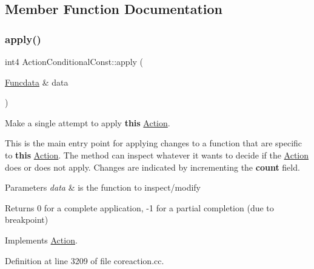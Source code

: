 \subsection{Member Function Documentation}
\mbox{\label{class_action_conditional_const_a36547a8bf4913bf94efa661b7f39e461}} 
\subsubsection{\texorpdfstring{apply()}{apply()}}
{\footnotesize\ttfamily int4 Action\+Conditional\+Const\+::apply (\begin{DoxyParamCaption}\item[{\mbox{\hyperlink{class_funcdata}{Funcdata}} \&}]{data }\end{DoxyParamCaption})\hspace{0.3cm}{\ttfamily [virtual]}}



Make a single attempt to apply {\bfseries{this}} \mbox{\hyperlink{class_action}{Action}}. 

This is the main entry point for applying changes to a function that are specific to {\bfseries{this}} \mbox{\hyperlink{class_action}{Action}}. The method can inspect whatever it wants to decide if the \mbox{\hyperlink{class_action}{Action}} does or does not apply. Changes are indicated by incrementing the {\bfseries{count}} field. 
\begin{DoxyParams}{Parameters}
{\em data} & is the function to inspect/modify \\
\hline
\end{DoxyParams}
\begin{DoxyReturn}{Returns}
0 for a complete application, -\/1 for a partial completion (due to breakpoint) 
\end{DoxyReturn}


Implements \mbox{\hyperlink{class_action_aac1c3999d6c685b15f5d9765a4d04173}{Action}}.



Definition at line 3209 of file coreaction.\+cc.

